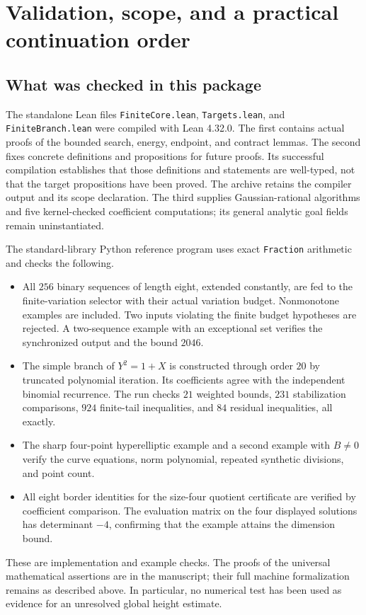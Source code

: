\section{Validation, scope, and a practical continuation order}

\subsection{What was checked in this package}

The standalone Lean files \texttt{FiniteCore.lean},
\texttt{Targets.lean}, and \texttt{FiniteBranch.lean} were compiled
with Lean 4.32.0. The first
contains actual proofs of the bounded search, energy, endpoint, and
contract lemmas. The second fixes concrete definitions and propositions
for future proofs. Its successful compilation establishes that those
definitions and statements are well-typed, not that the target
propositions have been proved. The archive retains the compiler output
and its scope declaration. The third supplies Gaussian-rational
algorithms and five kernel-checked coefficient computations; its
general analytic goal fields remain uninstantiated.

The standard-library Python reference program uses exact
\texttt{Fraction} arithmetic and checks the following.
\begin{itemize}
\item All $256$ binary sequences of length eight, extended constantly,
are fed to the finite-variation selector with their actual variation
budget. Nonmonotone examples are included. Two inputs violating the
finite budget hypotheses are rejected. A two-sequence example with an
exceptional set verifies the synchronized output and the bound $2046$.
\item The simple branch of $Y^2=1+X$ is constructed through order $20$
by truncated polynomial iteration. Its coefficients agree with the
independent binomial recurrence. The run checks $21$ weighted bounds,
$231$ stabilization comparisons, $924$ finite-tail inequalities, and
$84$ residual inequalities, all exactly.
\item The sharp four-point hyperelliptic example and a second example
with $B\ne0$ verify the curve equations, norm polynomial, repeated
synthetic divisions, and point count.
\item All eight border identities for the size-four quotient certificate
are verified by coefficient comparison. The evaluation matrix on the
four displayed solutions has determinant $-4$, confirming that the
example attains the dimension bound.
\end{itemize}
These are implementation and example checks. The proofs of the universal
mathematical assertions are in the manuscript; their full machine
formalization remains as described above. In particular, no numerical
test has been used as evidence for an unresolved global height estimate.


